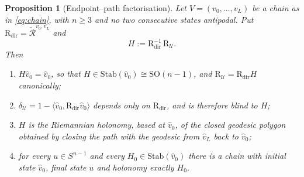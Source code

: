 \documentclass[10pt,a4paper]{amsart}
\newtheorem{proposition}{Proposition}
\newcommand{\Rmin}{\widetilde{\mathcal{R}}}
\newcommand{\SO}{\mathrm{SO}}
\newcommand{\Stab}{\mathrm{Stab}}
\newcommand{\Uc}{\mathcal{U}}
\begin{document}
\begin{proposition}[Endpoint--path factorisation]\label{prop:holonomy}
Let $V = (v_0,\dots,v_L)$ be a chain as in \eqref{eq:chain}, with
$n \ge 3$ and no two consecutive states antipodal. Put
$\mathrm{R}_{\mathrm{dir}} = \Rmin^{v_0,v_L}$ and
\begin{equation}\label{eq:holdef}
H := \mathrm{R}_{\mathrm{dir}}^{-1}\,\mathrm{R}_\Uc .
\end{equation}
Then
\begin{enumerate}
\item[(i)] $H\hat{v}_0 = \hat{v}_0$, so that
$H \in \Stab(\hat{v}_0) \cong \SO(n-1)$, and
$\mathrm{R}_\Uc = \mathrm{R}_{\mathrm{dir}}H$ canonically;
\item[(ii)] $\delta_\Uc = 1 - \langle \hat{v}_0,
\mathrm{R}_{\mathrm{dir}}\hat{v}_0\rangle$ depends only on
$\mathrm{R}_{\mathrm{dir}}$, and is therefore blind to $H$;
\item[(iii)] $H$ is the Riemannian holonomy, based at $\hat{v}_0$, of
the closed geodesic polygon obtained by closing the path with the
geodesic from $\hat{v}_L$ back to $\hat{v}_0$;
\item[(iv)] for every $u \in S^{n-1}$ and every
$H_0 \in \Stab(\hat{v}_0)$ there is a chain with initial state
$\hat{v}_0$, final state $u$ and holonomy exactly $H_0$.
\end{enumerate}
\end{proposition}
\end{document}
